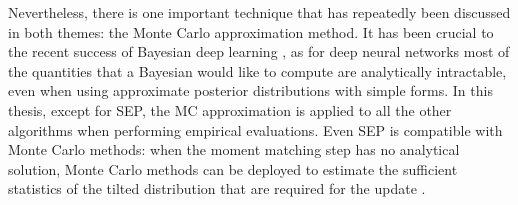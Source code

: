 Nevertheless, there is one important technique that has repeatedly been discussed in both themes: the Monte Carlo approximation method. It has been crucial to the recent success of Bayesian deep learning \citep{graves:practical2011, kingma:vae2014, rezende:vae2014, blundell:bnn2015, gal:uncertainty2016, li:amcmc2017}, as for deep neural networks most of the quantities that a Bayesian would like to compute are analytically intractable, even when using approximate posterior distributions with simple forms. In this thesis, except for SEP, the MC approximation is applied to all the other algorithms when performing empirical evaluations. Even SEP is compatible with Monte Carlo methods: when the moment matching step has no analytical solution, Monte Carlo methods can be deployed to estimate the sufficient statistics of the tilted distribution that are required for the update \citep{barthelme:abc2011, gelman:dep2014}. 

